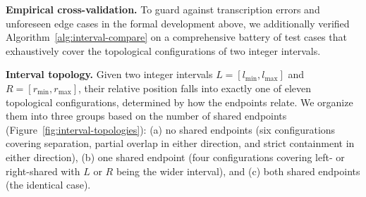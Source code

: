 \documentclass[pdflatex,sn-basic]{sn-jnl}%
\theoremstyle{thmstyleone}%
\theoremstyle{thmstyletwo}%
\theoremstyle{thmstylethree}%
\begin{document}
\smallskip
\noindent\textbf{Empirical cross-validation.}
To guard against transcription errors and unforeseen edge cases in the formal development above, we additionally verified Algorithm~\ref{alg:interval-compare} on a comprehensive battery of test cases that exhaustively cover the topological configurations of two integer intervals.

\smallskip
\noindent\textbf{Interval topology.}
Given two integer intervals $L = [l_{\min}, l_{\max}]$ and $R = [r_{\min}, r_{\max}]$, their relative position falls into exactly one of eleven topological configurations, determined by how the endpoints relate.
We organize them into three groups based on the number of shared endpoints (Figure~\ref{fig:interval-topologies}): (a) no shared endpoints (six configurations covering separation, partial overlap in either direction, and strict containment in either direction), (b) one shared endpoint (four configurations covering left- or right-shared with $L$ or $R$ being the wider interval), and (c) both shared endpoints (the identical case).
\end{document}
